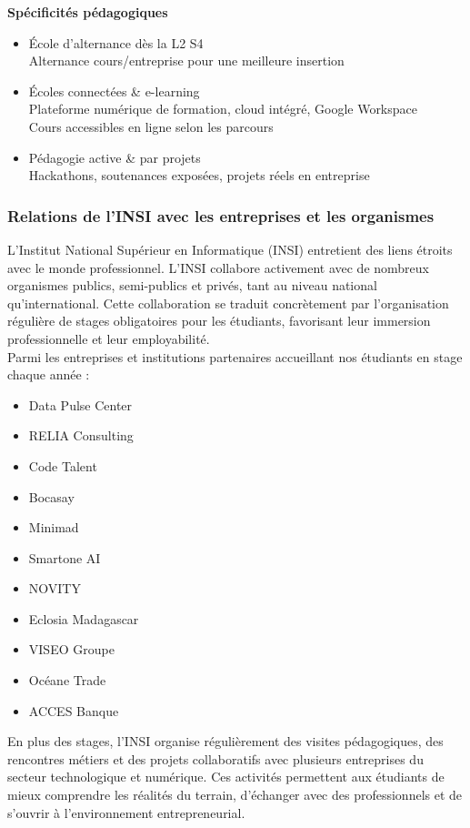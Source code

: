 \documentclass[a4paper,12pt, oneside]{article}
\begin{document}
\textbf{Spécificités pédagogiques} 
\begin{itemize}
    \item École d'alternance dès la L2 S4\\
    Alternance cours/entreprise pour une meilleure insertion
    \item Écoles connectées \& e-learning\\
    Plateforme numérique de formation, cloud intégré, Google Workspace\\
    Cours accessibles en ligne selon les parcours
    \item Pédagogie active \& par projets\\
    Hackathons, soutenances exposées, projets réels en entreprise
\end{itemize}

\subsubsection{Relations de l’INSI avec les entreprises et les organismes} 
L’Institut National Supérieur en Informatique (INSI) entretient des liens étroits avec le monde professionnel. L’INSI collabore activement avec de nombreux organismes publics, semi-publics et privés, tant au niveau national qu’international. Cette collaboration se traduit concrètement par l’organisation régulière de stages obligatoires pour les étudiants, favorisant leur immersion professionnelle et leur employabilité.\\

Parmi les entreprises et institutions partenaires accueillant nos étudiants en stage chaque année :
\begin{itemize}
    \item Data Pulse Center
    \item RELIA Consulting
    \item Code Talent
    \item Bocasay
    \item Minimad
    \item Smartone AI
    \item NOVITY
    \item Eclosia Madagascar
    \item VISEO Groupe
    \item Océane Trade
    \item ACCES Banque
\end{itemize}

En plus des stages, l’INSI organise régulièrement des visites pédagogiques, des rencontres métiers et des projets collaboratifs avec plusieurs entreprises du secteur technologique et numérique. Ces activités permettent aux étudiants de mieux comprendre les réalités du terrain, d’échanger avec des professionnels et de s’ouvrir à l’environnement entrepreneurial.\\
\end{document}
